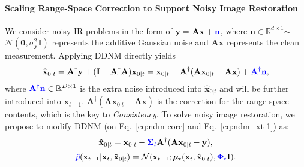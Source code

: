 \documentclass{article} \usepackage{iclr2023_conference,times}
\begin{document}
\paragraph{Scaling Range-Space Correction to Support Noisy Image Restoration} We consider noisy IR problems in the form of $\mathbf{y}$$=$$ \mathbf{A}\mathbf{x} + \textcolor{blue}{\mathbf{n}}$, where $\mathbf{n}$$\in$$\mathbb{R}^{d\times 1}$$\sim$$\mathcal{N}(\mathbf{0}, \sigma_{\mathbf{y}}^2\mathbf{I})$ represents the additive Gaussian noise and $\mathbf{A}\mathbf{x}$ represents the clean measurement. Applying DDNM directly yields 
\begin{equation}
    \mathbf{\hat{x}}_{0|t} = \mathbf{A^{\dagger}}\mathbf{y} + (\mathbf{I} - \mathbf{A^{\dagger}}\mathbf{A})\mathbf{x}_{0|t}=\mathbf{x}_{0|t} - \mathbf{A}^{\dagger}(\mathbf{A}\mathbf{x}_{0|t}-\mathbf{A}\mathbf{x}) + \textcolor{blue}{\mathbf{A}^{\dagger}\mathbf{n}},
    \label{eq:noisy_1}
\end{equation}
where $\textcolor{blue}{\mathbf{A}^{\dagger}\mathbf{n}}\in\mathbb{R}^{D\times 1}$ is the extra noise introduced into $\mathbf{\hat{x}}_{0|t}$ and will be further introduced into $\mathbf{x}_{t-1}$. $\mathbf{A}^{\dagger}(\mathbf{A}\mathbf{x}_{0|t}-\mathbf{A}\mathbf{x})$ is the correction for the range-space contents, which is the key to \textit{Consistency}. To solve noisy image restoration, we propose to modify DDNM (on Eq.~\ref{eq:ndm core} and Eq.~\ref{eq:ndm_xt-1}) as: 
\begin{equation}
    \mathbf{\hat{x}}_{0|t} = \mathbf{x}_{0|t} - \textcolor{blue}{\mathbf{\Sigma}_{t}}\mathbf{A}^{\dagger}(\mathbf{A}\mathbf{x}_{0|t}-\mathbf{y}),
    \label{eq:ndm+ core}
\end{equation}
\begin{equation}
    \textcolor{blue}{\hat{p}}(\mathbf{x}_{t-1}|\mathbf{x}_{t},\mathbf{\hat{x}}_{0|t})
    =\mathcal{N}(\mathbf{x}_{t-1};\boldsymbol{\mu}_{t}(\mathbf{x}_{t},\mathbf{\hat{x}}_{0|t}),\textcolor{blue}{\mathbf{\Phi}_{t}}\mathbf{I}).
    \label{eq:ndm+ p}
\end{equation}
\end{document}
